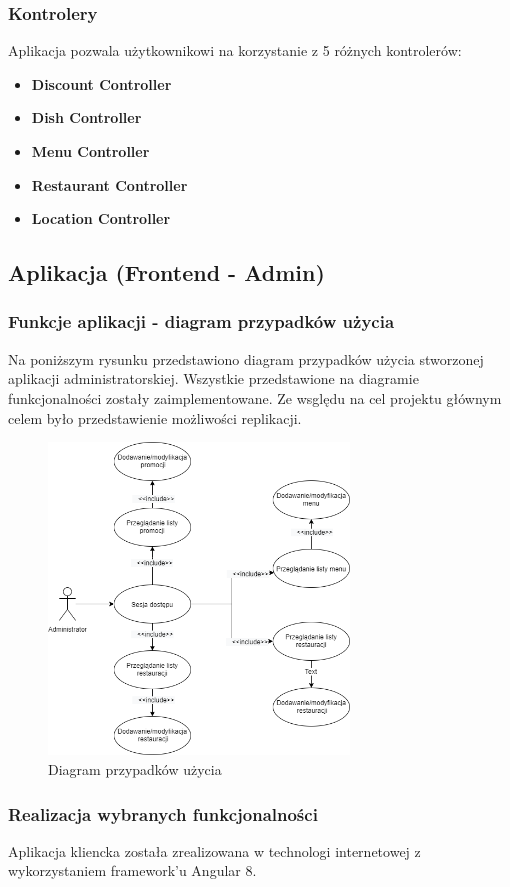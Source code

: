 \documentclass{article}
\begin{document}
		\subsubsection{Kontrolery}
		Aplikacja pozwala użytkownikowi na korzystanie z 5 różnych kontrolerów:
			\begin{itemize}
				\item
					\textbf{Discount Controller} 
				\item
					\textbf{Dish Controller}
				\item
					\textbf{Menu Controller}
				\item
					\textbf{Restaurant Controller}
				\item
					\textbf{Location Controller}
			\end{itemize}
		
	\newpage
	\subsection{Aplikacja (Frontend - Admin)}
		\subsubsection{Funkcje aplikacji - diagram przypadków użycia}
		Na poniższym rysunku przedstawiono diagram przypadków użycia stworzonej aplikacji administratorskiej. Wszystkie przedstawione na diagramie funkcjonalności zostały zaimplementowane. Ze wsględu na cel projektu głównym celem było przedstawienie możliwości replikacji.
			\begin{figure}[hbt!]
				\includegraphics[width=8cm]{Files/Pictures/UMLAdminApp}
				\centering
				\caption{Diagram przypadków użycia}
			\end{figure}
		\subsubsection{Realizacja wybranych funkcjonalności}
		Aplikacja kliencka została zrealizowana w technologi internetowej z wykorzystaniem framework'u Angular 8.
\end{document}
